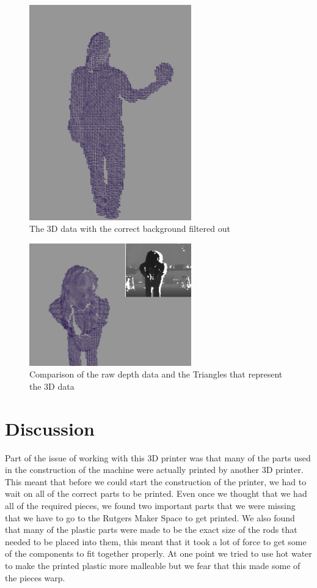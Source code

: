 \documentclass[pdftex,10.5pt]{report}
\begin{document}
\begin{figure}[H]
	\centering
	\includegraphics[width=70mm]{figures/cadyholdingball.png}
	\caption{The 3D data with the correct background filtered out}
	\label{balls2}
\end{figure}

\begin{figure}[H]
	\centering
	\includegraphics[width=70mm]{figures/cadyholdingball2.png}
	\caption{Comparison of the raw depth data and the Triangles that represent the 3D data}
	\label{balls2}
\end{figure}

\section{Discussion}
Part of the issue of working with this 3D printer was that many of the parts used in the construction of the machine were actually printed by another 3D printer. This meant that before we could start the construction of the printer, we had to wait on all of the correct parts to be printed. Even once we thought that we had all of the required pieces, we found two important parts that we were missing that we have to go to the Rutgers Maker Space to get printed. We also found that many of the plastic parts were made to be the exact size of the rods that needed to be placed into them, this meant that it took a lot of force to get some of the components to fit together properly. At one point we tried to use hot water to make the printed plastic more malleable but we fear that this made some of the pieces warp.
\end{document}
